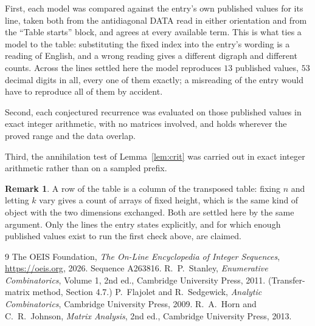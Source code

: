 \documentclass[11pt,a4paper]{article}
\theoremstyle{plain}
\theoremstyle{definition}
\newtheorem{remark}[theorem]{Remark}
\begin{document}
First, each model was compared against the entry's own published values for its line, taken
both from the antidiagonal DATA read in either orientation and from the ``Table starts''
block, and agrees at every available term. This is what ties a model to the table:
substituting the fixed index into the entry's wording is a reading of English, and a wrong
reading gives a different digraph and different counts. Across the lines settled here the
model reproduces $13$ published values, $53$ decimal digits in all, every one of
them exactly; a misreading of the entry would have to reproduce all of them by accident.

Second, each conjectured recurrence was evaluated on those published values in exact
integer arithmetic, with no matrices involved, and holds wherever the proved range and the
data overlap.

Third, the annihilation test of Lemma~\ref{lem:crit} was carried out in exact integer
arithmetic rather than on a sampled prefix.

\begin{remark}
A row of the table is a column of the transposed table: fixing $n$ and letting $k$ vary gives a
count of arrays of fixed height, which is the same kind of object with the two dimensions
exchanged. Both are settled here by the same argument. Only the lines the entry states
explicitly, and for which enough published values exist to run the first check above, are
claimed.
\end{remark}

\begin{thebibliography}{9}
 The OEIS Foundation, \emph{The On-Line Encyclopedia of Integer
Sequences}, \url{https://oeis.org}, 2026. Sequence A263816.
 R.~P.~Stanley, \emph{Enumerative Combinatorics}, Volume 1, 2nd ed.,
Cambridge University Press, 2011. (Transfer-matrix method, Section 4.7.)
 P.~Flajolet and R.~Sedgewick, \emph{Analytic Combinatorics}, Cambridge
University Press, 2009.
 R.~A.~Horn and C.~R.~Johnson, \emph{Matrix Analysis}, 2nd ed., Cambridge
University Press, 2013.
\end{thebibliography}
\end{document}
